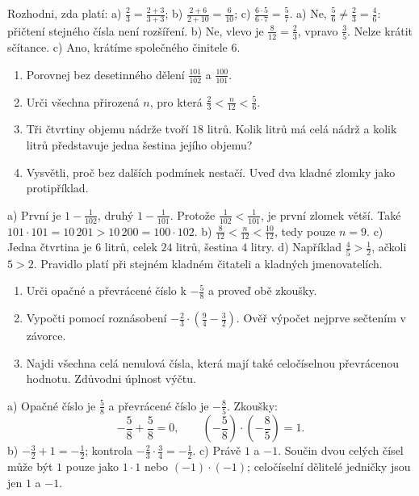 \documentclass[11pt,a4paper]{article}
\begin{document}
\begin{zadaniReseniBox}[title={Samostatná práce 2},breakable=false]
Rozhodni, zda platí: a) $\frac23=\frac{2+3}{3+3}$;
b) $\frac{2+6}{2+10}=\frac6{10}$;
c) $\frac{6\cdot5}{6\cdot7}=\frac57$.
\tcblower
a) Ne, $\frac56\ne\frac23=\frac46$: přičtení stejného čísla není rozšíření.
b) Ne, vlevo je $\frac8{12}=\frac23$, vpravo $\frac35$.
Nelze krátit sčítance. c) Ano, krátíme společného činitele $6$.
\end{zadaniReseniBox}


\newpage
{}
\begin{zadaniReseniBox}[title={Rozšíření 1},breakable=false]
\begin{enumerate}[label=\alph*)]
\item Porovnej bez desetinného dělení $\frac{101}{102}$ a $\frac{100}{101}$.
\item Urči všechna přirozená $n$, pro která $\frac23<\frac n{12}<\frac56$.
\item Tři čtvrtiny objemu nádrže tvoří $18$ litrů. Kolik litrů
má celá nádrž a kolik litrů představuje jedna šestina jejího objemu?
\item Vysvětli, proč  bez dalších
podmínek nestačí. Uveď dva kladné zlomky jako protipříklad.
\end{enumerate}
\tcblower
a) První je $1-\frac1{102}$, druhý $1-\frac1{101}$.
Protože $\frac1{102}<\frac1{101}$, je první zlomek větší.
Také $101\cdot101=10\,201>10\,200=100\cdot102$.
b) $\frac8{12}<\frac n{12}<\frac{10}{12}$, tedy pouze $n=9$.
c) Jedna čtvrtina je $6$ litrů, celek $24$ litrů, šestina $4$ litry.
d) Například $\frac45>\frac12$, ačkoli $5>2$.
Pravidlo platí při stejném kladném čitateli a kladných jmenovatelích.
\end{zadaniReseniBox}

\begin{zadaniReseniBox}[title={Rozšíření 2},breakable=false]
\begin{enumerate}[label=\alph*)]
\item Urči opačné a převrácené číslo k $-\frac58$ a proveď obě zkoušky.
\item Vypočti pomocí roznásobení $-\frac23\cdot(\frac94-\frac32)$.
Ověř výpočet nejprve sečtením v závorce.
\item Najdi všechna celá nenulová čísla, která mají také celočíselnou
převrácenou hodnotu. Zdůvodni úplnost výčtu.
\end{enumerate}
\tcblower
a) Opačné číslo je $\frac{5}{8}$ a převrácené číslo je $-\frac{8}{5}$.
Zkoušky:
\[
-\frac{5}{8}+\frac{5}{8}=0,\qquad
\left(-\frac{5}{8}\right)\cdot\left(-\frac{8}{5}\right)=1.
\]
b) $-\frac32+1=-\frac12$; kontrola $-\frac23\cdot\frac34=-\frac12$.
c) Právě $1$ a $-1$. Součin dvou celých čísel může být $1$ pouze jako
$1\cdot1$ nebo $(-1)\cdot(-1)$; celočíselní dělitelé jedničky jsou jen $1$ a $-1$.
\end{zadaniReseniBox}
\end{document}
